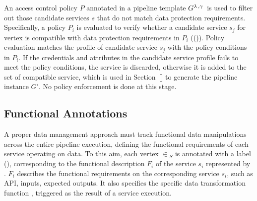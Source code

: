 An access control policy $P$ annotated in a pipeline template $G^{\lambda\,,\gamma\,}$ is used to filter out those candidate services $s$ that do not match data protection requirements. Specifically, a policy $P_i$ is evaluated to verify whether a candidate service $s_j$ for vertex  is compatible with data protection requirements in $P_i$ (\myLambda()). Policy evaluation matches the profile of candidate service $s_j$ with the policy conditions in $P_i$. If the credentials and attributes in the candidate service profile fails to meet the policy conditions, the service is discarded, otherwise it is added to the set of compatible service, which is used in Section~\ref{} to generate the pipeline instance $G'$. No policy enforcement is done at this stage.

\subsection{Functional Annotations \myGamma}\label{sec:funcannotation}
A proper data management approach must track functional data manipulations across the entire pipeline execution, defining the functional requirements of each service operating on data.
To this aim, each vertex $\in$\V$_S$ is annotated with a label \myGamma(), corresponding to the functional description $F_i$ of the service $s_i$ represented by .
$F_i$ describes the functional requirements on the corresponding service $s_i$, such as API, inputs, expected outputs.
It also specifies the specific data transformation function \TF{}, triggered as the result of a service execution. %

